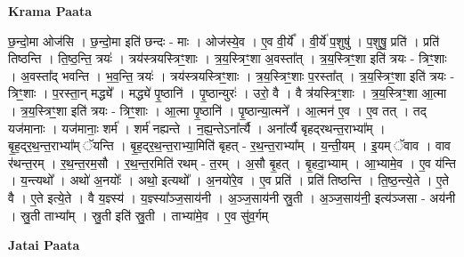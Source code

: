 \documentclass[17pt]{extarticle}
\begin{document}
\textbf{Krama Paata} \newline

छ॒न्दो॒मा ओज॑सि । छ॒न्दो॒मा इति॑ छन्दः - माः । ओज॑स्ये॒व । ए॒व वी॒र्ये᳚ । वी॒र्ये॑ प॒शुषु॑ । प॒शुषु॒ प्रति॑ । प्रति॑ तिष्ठन्ति । ति॒ष्ठ॒न्ति॒ त्रयः॑ । त्रय॑स्त्रयस्त्रिꣳ॒॒शाः । त्र॒य॒स्त्रिꣳ॒॒शा अ॒वस्ता᳚त् । त्र॒य॒स्त्रिꣳ॒॒शा इति॑ त्रयः - त्रिꣳ॒॒शाः । अ॒वस्ता᳚द् भवन्ति । भ॒व॒न्ति॒ त्रयः॑ । त्रय॑स्त्रयस्त्रिꣳ॒॒शाः । त्र॒य॒स्त्रिꣳ॒॒शाः प॒रस्ता᳚त् । त्र॒य॒स्त्रिꣳ॒॒शा इति॑ त्रयः - त्रिꣳ॒॒शाः । प॒रस्ता॒न् मद्ध्ये᳚ । मद्ध्ये॑ पृ॒ष्ठानि॑ । पृ॒ष्ठान्युरः॑ । उरो॒ वै । वै त्र॑यस्त्रिꣳ॒॒शाः । त्र॒य॒स्त्रिꣳ॒॒शा आ॒त्मा । त्र॒य॒स्त्रिꣳ॒॒शा इति॑ त्रयः - त्रिꣳ॒॒शाः । आ॒त्मा पृ॒ष्ठानि॑ । पृ॒ष्ठान्या॒त्मने᳚ । आ॒त्मन॑ ए॒व । ए॒व तत् । तद् यज॑मानाः । यज॑मानाः॒ शर्म॑ । शर्म॑ नह्यन्ते । न॒ह्य॒न्तेऽना᳚र्त्यै । अना᳚र्त्यै बृहद्‍रथन्त॒राभ्या᳚म् । बृ॒ह॒द्‍र॒थ॒न्त॒राभ्या᳚म् ॅयन्ति । बृ॒ह॒द्‍र॒थ॒न्त॒राभ्या॒मिति॑ बृहत् - र॒थ॒न्त॒राभ्या᳚म् । य॒न्ती॒यम् । इ॒यम् ॅवाव । वाव र॑थन्त॒रम् । र॒थ॒न्त॒रम॒सौ । र॒थ॒न्त॒रमिति॑ रथम् - त॒रम् । अ॒सौ बृ॒हत् । बृ॒हदा॒भ्याम् । आ॒भ्यामे॒व । ए॒व य॑न्ति । य॒न्त्यथो᳚ । अथो॑ अ॒नयोः᳚ । अथो॒ इत्यथो᳚ । अ॒नयो॑रे॒व । ए॒व प्रति॑ । प्रति॑ तिष्ठन्ति । ति॒ष्ठ॒न्त्ये॒ते । ए॒ते वै । ए॒ते इत्ये॒ते । वै य॒ज्ञ्स्य॑ । य॒ज्ञ्स्या᳚ञ्ज॒साय॑नी । अ॒ञ्ज॒साय॑नी स्रु॒ती । अ॒ञ्ज॒साय॑नी॒ इत्य॑ञ्जसा - अय॑नी । स्रु॒ती ताभ्या᳚म् । 
स्रु॒ती इति॑ स्रु॒ती । ताभ्या॑मे॒व । ए॒व सु॑व॒र्गम् \newline

\textbf{Jatai Paata} \newline
\end{document}
